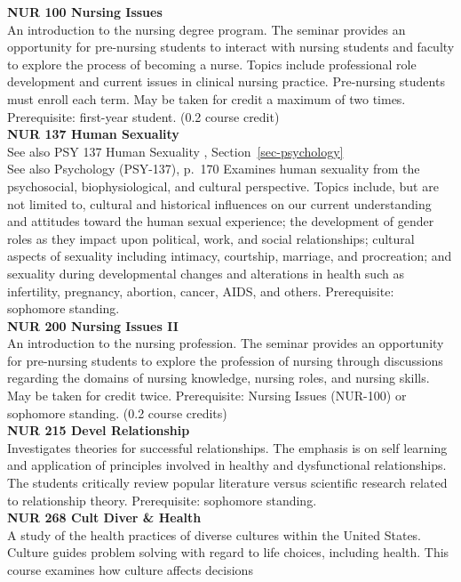 \documentclass[
  letterpaper,
]{scrbook}
\begin{document}
\textbf{NUR 100 Nursing Issues}\\
An introduction to the nursing degree program. The seminar provides an
opportunity for pre-nursing students to interact with nursing students
and faculty to explore the process of becoming a nurse. Topics include
professional role development and current issues in clinical nursing
practice. Pre-nursing students must enroll each term. May be taken for
credit a maximum of two times. Prerequisite: first-year student. (0.2
course credit)\\
\textbf{NUR 137 Human Sexuality}\\
See also PSY 137 Human Sexuality , Section~\ref{sec-psychology}\\
See also Psychology (PSY-137), p.~170 Examines human sexuality from the
psychosocial, biophysiological, and cultural perspective. Topics
include, but are not limited to, cultural and historical influences on
our current understanding and attitudes toward the human sexual
experience; the development of gender roles as they impact upon
political, work, and social relationships; cultural aspects of sexuality
including intimacy, courtship, marriage, and procreation; and sexuality
during developmental changes and alterations in health such as
infertility, pregnancy, abortion, cancer, AIDS, and others.
Prerequisite: sophomore standing.\\
\textbf{NUR 200 Nursing Issues II}\\
An introduction to the nursing profession. The seminar provides an
opportunity for pre-nursing students to explore the profession of
nursing through discussions regarding the domains of nursing knowledge,
nursing roles, and nursing skills. May be taken for credit twice.
Prerequisite: Nursing Issues (NUR-100) or sophomore standing. (0.2
course credits)\\
\textbf{NUR 215 Devel Relationship}\\
Investigates theories for successful relationships. The emphasis is on
self learning and application of principles involved in healthy and
dysfunctional relationships. The students critically review popular
literature versus scientific research related to relationship theory.
Prerequisite: sophomore standing.\\
\textbf{NUR 268 Cult Diver \& Health}\\
A study of the health practices of diverse cultures within the United
States. Culture guides problem solving with regard to life choices,
including health. This course examines how culture affects decisions
\end{document}
